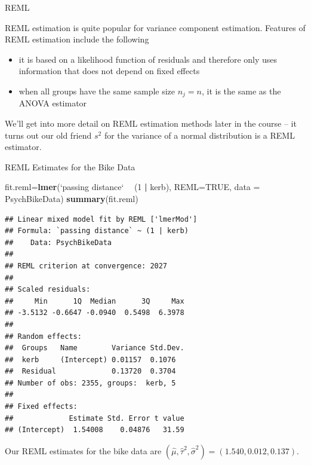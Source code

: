 \documentclass[ignorenonframetext,]{beamer}
\newenvironment{Shaded}{\begin{snugshade}}{\end{snugshade}}
\newcommand{\KeywordTok}[1]{\textcolor[rgb]{0.13,0.29,0.53}{\textbf{#1}}}
\newcommand{\DataTypeTok}[1]{\textcolor[rgb]{0.13,0.29,0.53}{#1}}
\newcommand{\DecValTok}[1]{\textcolor[rgb]{0.00,0.00,0.81}{#1}}
\newcommand{\StringTok}[1]{\textcolor[rgb]{0.31,0.60,0.02}{#1}}
\newcommand{\OtherTok}[1]{\textcolor[rgb]{0.56,0.35,0.01}{#1}}
\newcommand{\OperatorTok}[1]{\textcolor[rgb]{0.81,0.36,0.00}{\textbf{#1}}}
\newcommand{\NormalTok}[1]{#1}
\providecommand{\tightlist}{%
  \setlength{\itemsep}{0pt}\setlength{\parskip}{0pt}}
\begin{document}
\begin{frame}{REML}

REML estimation is quite popular for variance component estimation.
Features of REML estimation include the following

\begin{itemize}
\tightlist
\item
  it is based on a likelihood function of residuals and therefore only
  uses information that does not depend on fixed effects
\item
  when all groups have the same sample size \(n_j=n\), it is the same as
  the ANOVA estimator
\end{itemize}

We'll get into more detail on REML estimation methods later in the
course -- it turns out our old friend \(s^2\) for the variance of a
normal distribution is a REML estimator.

\end{frame}

\begin{frame}[fragile]{REML Estimates for the Bike Data}

\begin{Shaded}
\begin{Highlighting}[]
\NormalTok{fit.reml=}\KeywordTok{lmer}\NormalTok{(}\StringTok{`}\DataTypeTok{passing distance}\StringTok{`} \OperatorTok{~}\StringTok{ }\NormalTok{(}\DecValTok{1} \OperatorTok{|}\StringTok{ }\NormalTok{kerb), }\DataTypeTok{REML=}\OtherTok{TRUE}\NormalTok{, }\DataTypeTok{data =}\NormalTok{ PsychBikeData)}
\KeywordTok{summary}\NormalTok{(fit.reml)}
\end{Highlighting}
\end{Shaded}

\begin{verbatim}
## Linear mixed model fit by REML ['lmerMod']
## Formula: `passing distance` ~ (1 | kerb)
##    Data: PsychBikeData
## 
## REML criterion at convergence: 2027
## 
## Scaled residuals: 
##     Min      1Q  Median      3Q     Max 
## -3.5132 -0.6647 -0.0940  0.5498  6.3978 
## 
## Random effects:
##  Groups   Name        Variance Std.Dev.
##  kerb     (Intercept) 0.01157  0.1076  
##  Residual             0.13720  0.3704  
## Number of obs: 2355, groups:  kerb, 5
## 
## Fixed effects:
##             Estimate Std. Error t value
## (Intercept)  1.54008    0.04876   31.59
\end{verbatim}

Our REML estimates for the bike data are
\((\widehat{\mu},\widehat{\tau}^2,\widehat{\sigma}^2)=(1.540, 0.012, 0.137)\).

\end{frame}
\end{document}
